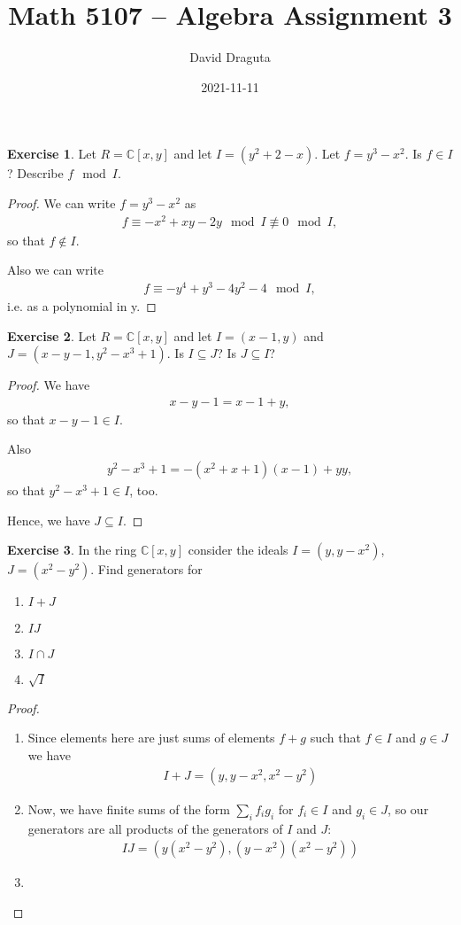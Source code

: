 \documentclass[12pt]{extarticle}
\title{ Math 5107 -- Algebra Assignment 3}
\author{David Draguta}
\date{2021-11-11}
\newcommand{\C}{\mathbb{C}}
\newcommand{\<}{\langle}
\renewcommand{\>}{\rangle}
\theoremstyle{definition}
\newtheorem{exercise}{Exercise}
\begin{document}
\maketitle

\begin{exercise}
  Let $R=\C[x,y]$ and let $I=(y^2+2-x)$. Let $f=y^3-x^2$. Is $f \in I$? Describe $f \mod I$.
\end{exercise}
\begin{proof}
  We can write $f=y^3-x^2$ as
  \begin{align}
    f \equiv -x^2+xy-2y \mod I \not \equiv 0 \mod I ,
  \end{align}
  so that $f \not \in I$.

  Also we can write
  \begin{align*}
    f \equiv -y^4 + y^3 - 4y^2 - 4 \mod I ,
  \end{align*}
  i.e. as a polynomial in y.
\end{proof}
\begin{exercise}
  Let $R=\C[x,y]$ and let $I=(x-1,y)$ and $J=(x-y-1, y^2-x^3+1)$. Is $I \subseteq J$? Is $J \subseteq I$?
\end{exercise}
\begin{proof}
  We have
  \begin{align}
    x-y-1 = x-1 + y,
  \end{align}
  so that $x-y-1 \in I$.

  Also
  \begin{align}
    y^2-x^3+1 = -(x^2+x+1)(x-1) + yy,
  \end{align}
  so that $y^2-x^3+1 \in I$, too.

  Hence, we have $J \subseteq I$.
\end{proof}

\begin{exercise}
  In the ring $\C[x,y]$ consider the ideals $I = (y,y-x^2)$, $J= (x^2 - y^2)$. Find generators for
  \begin{enumerate}
  \item
    $I + J$
  \item
    $IJ$
  \item
    $I \cap J$
  \item
    $\sqrt{I}$
  \end{enumerate}
\end{exercise}
\begin{proof}
  \begin{enumerate}
  \item
    Since elements here are just sums of elements $f + g$ such that $f \in I$ and $g \in J$ we have
    \begin{align}
      I + J = (y,y-x^2,x^2-y^2)
    \end{align}
  \item
    Now, we have finite sums of the form $\sum\limits_i f_i g_i$ for $f_i \in I$ and $g_i \in J$, so our generators are all products of the generators of $I$ and $J$:
    \begin{align}
      IJ = (y(x^2-y^2), (y-x^2)(x^2-y^2))
    \end{align}
  \item
    
  \end{enumerate}
\end{proof}
\end{document}
